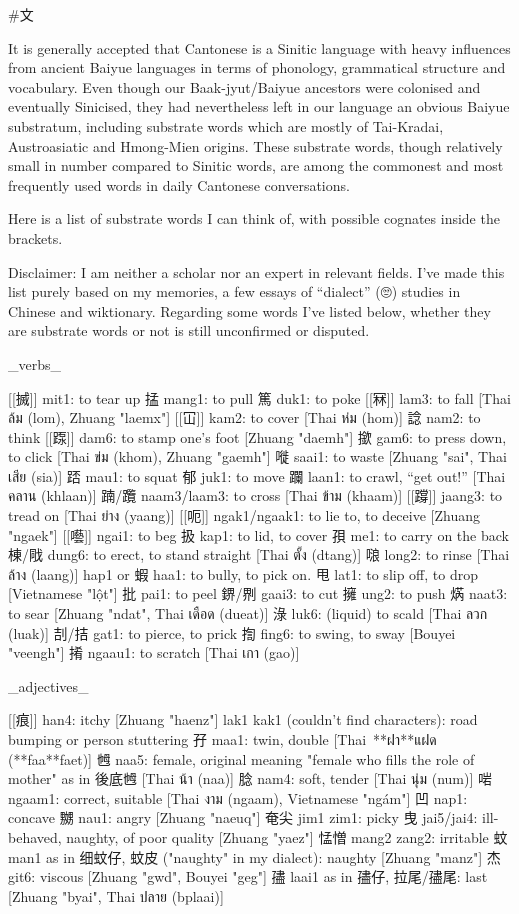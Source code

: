 #文 


It is generally accepted that Cantonese is a Sinitic language with heavy influences from ancient Baiyue languages in terms of phonology, grammatical structure and vocabulary. Even though our Baak-jyut/Baiyue ancestors were colonised and eventually Sinicised, they had nevertheless left in our language an obvious Baiyue substratum, including substrate words which are mostly of Tai-Kradai, Austroasiatic and Hmong-Mien origins. These substrate words, though relatively small in number compared to Sinitic words, are among the commonest and most frequently used words in daily Cantonese conversations.

Here is a list of substrate words I can think of, with possible cognates inside the brackets.

Disclaimer: I am neither a scholar nor an expert in relevant fields. I've made this list purely based on my memories, a few essays of “dialect” (🙄) studies in Chinese and wiktionary. Regarding some words I've listed below, whether they are substrate words or not is still unconfirmed or disputed.

_verbs_

[[搣]] mit1: to tear up  
掹 mang1: to pull  
篤 duk1: to poke  
[[冧]] lam3: to fall [Thai ล้ม (lom), Zhuang "laemx"]  
[[冚]] kam2: to cover [Thai ห่ม (hom)]  
諗 nam2: to think  
[[𨂽]] dam6: to stamp one's foot [Zhuang "daemh"]  
撳 gam6: to press down, to click [Thai ข่ม (khom), Zhuang "gaemh"]  
嘥 saai1: to waste [Zhuang "sai", Thai เสีย (sia)]  
踎 mau1: to squat  
郁 juk1: to move  
躝 laan1: to crawl, “get out!” [Thai คลาน (khlaan)]  
𨂾/𨈇 naam3/laam3: to cross [Thai ข้าม (khaam)]  
[[𨅝]] jaang3: to tread on [Thai ย่าง (yaang)]  
[[呃]] ngak1/ngaak1: to lie to, to deceive [Zhuang "ngaek"]  
[[囈]] ngai1: to beg  
扱 kap1: to lid, to cover  
孭 me1: to carry on the back  
棟/戙 dung6: to erect, to stand straight [Thai ตั้ง (dtang)]  
𠺘 long2: to rinse [Thai ล้าง (laang)]  
hap1 or 蝦 haa1: to bully, to pick on.  
甩 lat1: to slip off, to drop [Vietnamese "lột"]  
批 pai1: to peel  
鎅/𠝹 gaai3: to cut  
擁 ung2: to push  
焫 naat3: to sear [Zhuang "ndat", Thai เดือด (dueat)]  
淥 luk6: (liquid) to scald [Thai ลวก (luak)]  
㓤/拮 gat1: to pierce, to prick  
揈 fing6: to swing, to sway [Bouyei "veengh"]  
𢯎 ngaau1: to scratch [Thai เกา (gao)]

_adjectives_

[[痕]] han4: itchy [Zhuang "haenz"]  
lak1 kak1 (couldn't find characters): road bumping or person stuttering  
孖 maa1: twin, double [Thai **ฝา**แฝด (**faa**faet)]  
乸 naa5: female, original meaning "female who fills the role of mother" as in 後底乸 [Thai น้า (naa)]  
腍 nam4: soft, tender [Thai นุ่ม (num)]  
啱 ngaam1: correct, suitable [Thai งาม (ngaam), Vietnamese "ngám"]  
凹 nap1: concave  
嬲 nau1: angry [Zhuang "naeuq"]  
奄尖 jim1 zim1: picky  
曳 jai5/jai4: ill-behaved, naughty, of poor quality [Zhuang "yaez"]  
𢛴憎 mang2 zang2: irritable  
蚊 man1 as in 细蚊仔, 蚊皮 ("naughty" in my dialect): naughty [Zhuang "manz"]  
杰 git6: viscous [Zhuang "gwd", Bouyei "geg"]  
孻 laai1 as in 孻仔, 拉尾/孻尾: last [Zhuang "byai", Thai ปลาย (bplaai)]


